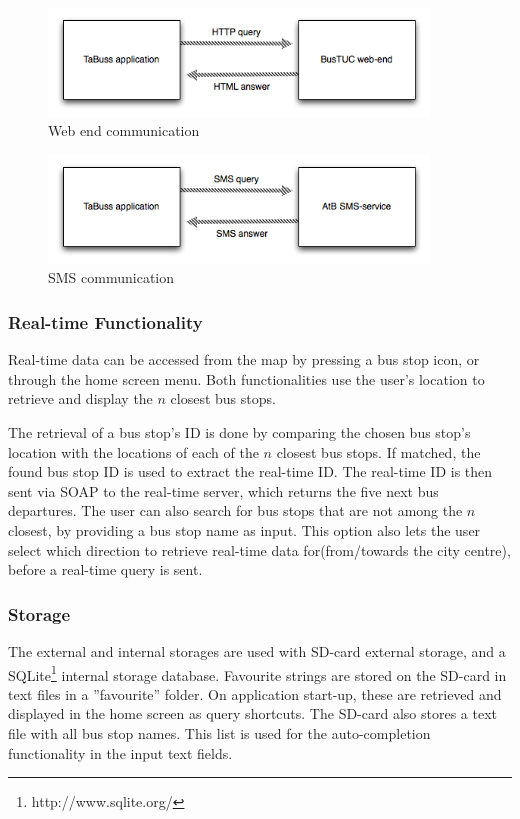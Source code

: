 \begin{figure}[!h]
\begin{center}
\includegraphics[width = 0.9\textwidth]{Method/Figures/webend.png}
\caption{Web end communication}
\end{center}
\label{fig:webend}
\end{figure}

\begin{figure}[!h]
\begin{center}
\includegraphics[width = 0.9\textwidth]{Method/Figures/sms.png}
\caption{SMS communication}
\end{center}
\label{fig:sms}
\end{figure}


\subsubsection{Real-time Functionality}
Real-time data can be accessed from the map by pressing a bus stop icon, or through the home screen menu. Both functionalities use the user's location to retrieve and display the $n$ closest bus stops.

The retrieval of a bus stop's ID is done by comparing the chosen bus stop's location with the locations of each of the $n$ closest bus stops. If matched, the found bus stop ID is used to extract the real-time ID. The real-time ID is then sent via SOAP to the real-time server, which returns the five next bus departures.
The user can also search for bus stops that are not among the $n$ closest, by providing a bus stop name as input. This option also lets the user select which direction to retrieve real-time data for(from/towards the city centre), before a real-time query is sent.

\subsubsection{Storage}
The external and internal storages are used with SD-card external storage, and a SQLite\footnote{http://www.sqlite.org/} internal storage database. Favourite strings are stored on the SD-card in text files in a ''favourite'' folder. On application start-up, these are retrieved and displayed in the home screen as query shortcuts. The SD-card also stores a text file with all bus stop names. This list is used for the auto-completion functionality in the input text fields.

